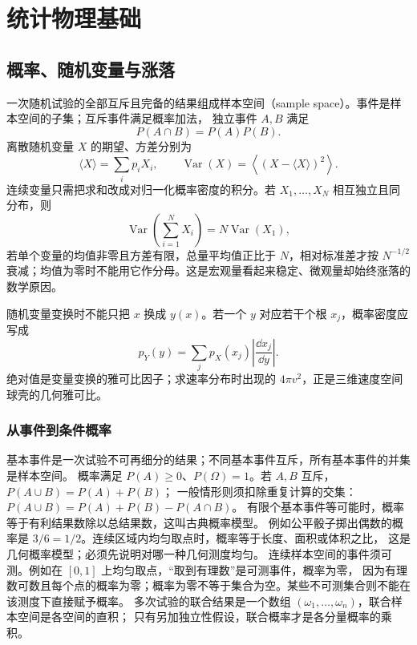 \hypersetup{bookmarksdepth=3}
\begingroup
\renewcommand{\Needspace}[1]{\par\begingroup
\dimen0=#1\relax\vskip0pt plus\dimen0\penalty-100
\vskip0pt plus-\dimen0\vskip\dimen0\penalty9999\vskip-\dimen0
\vskip0pt\endgroup}
\chapter{统计物理基础}



\section{概率、随机变量与涨落}

一次随机试验的全部互斥且完备的结果组成样本空间（sample space）。事件是样本空间的子集；互斥事件满足概率加法，
独立事件 $A,B$ 满足
\begin{equation}
 P(A\cap B)=P(A)P(B).
\end{equation}
离散随机变量 $X$ 的期望、方差分别为
\begin{equation}
 \langle X\rangle=\sum_i p_iX_i,
 \qquad
 \operatorname{Var}(X)=\left\langle(X-\langle X\rangle)^2\right\rangle.
\end{equation}
连续变量只需把求和改成对归一化概率密度的积分。若 $X_1,\ldots,X_N$ 相互独立且同分布，则
\[
 \operatorname{Var}\!\left(\sum_{i=1}^NX_i\right)=N\operatorname{Var}(X_1),
\]
若单个变量的均值非零且方差有限，总量平均值正比于 $N$，相对标准差才按 $N^{-1/2}$ 衰减；均值为零时不能用它作分母。这是宏观量看起来稳定、微观量却始终涨落的数学原因。

随机变量变换时不能只把 $x$ 换成 $y(x)$。若一个 $y$ 对应若干个根 $x_j$，概率密度应写成
\begin{equation}
 p_Y(y)=\sum_jp_X(x_j)\left|\frac{\dd x_j}{\dd y}\right|.
\end{equation}
绝对值是变量变换的雅可比因子；求速率分布时出现的 $4\pi v^2$，正是三维速度空间球壳的几何雅可比。
\subsection{从事件到条件概率}

基本事件是一次试验不可再细分的结果；不同基本事件互斥，所有基本事件的并集是样本空间。
概率满足 $P(A)\ge0$、$P(\Omega)=1$。若 $A,B$ 互斥，$P(A\cup B)=P(A)+P(B)$；
一般情形则须扣除重复计算的交集：$P(A\cup B)=P(A)+P(B)-P(A\cap B)$。
有限个基本事件等可能时，概率等于有利结果数除以总结果数，这叫古典概率模型。
例如公平骰子掷出偶数的概率是 $3/6=1/2$。连续区域内均匀取点时，概率等于长度、面积或体积之比，
这是几何概率模型；必须先说明对哪一种几何测度均匀。
连续样本空间的事件须可测。例如在 $[0,1]$ 上均匀取点，“取到有理数”是可测事件，概率为零，
因为有理数可数且每个点的概率为零；概率为零不等于集合为空。某些不可测集合则不能在该测度下直接赋予概率。
多次试验的联合结果是一个数组 $(\omega_1,\ldots,\omega_n)$，联合样本空间是各空间的直积；
只有另加独立性假设，联合概率才是各分量概率的乘积。

